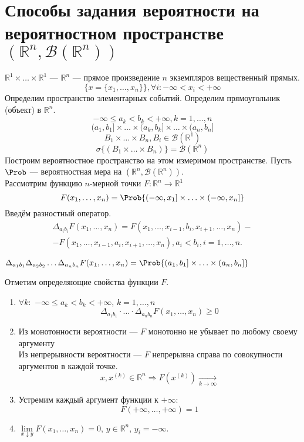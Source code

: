 \section{Способы задания вероятности на вероятностном пространстве $(\mathbb{R}^n, \mathcal{B} (\mathbb{R}^n))$}
$\mathbb{R}^1 \times \ldots \times \mathbb{R}^1$ --- $\mathbb{R}^n$ --- прямое произведение $n$ экземпляров вещественный прямых.
\[
	\{ x = \{ x_1, \ldots, x_n \} \}, \forall i: -\infty < x_i < +\infty
\]
Определим пространство элементарных событий. Определим прямоугольник (объект) в $\mathbb{R}^n$.
\[
	-\infty \leqslant a_k < b_k < +\infty, k = 1, \ldots, n
\]
\[
	(a_1, b_1] \times \ldots \times (a_k, b_k] \times \ldots \times (a_n, b_n]
\]
\[
	B_1 \times \ldots \times B_n, B_i \in \mathcal{B} (\mathbb{R}^1)
\]
\[
	\sigma \{ (B_1 \times \ldots \times B_n) \} = \mathcal{B} (\mathbb{R}^n)
\]
Построим вероятностное пространство на этом измеримом пространстве. Пусть $\Prob$ --- вероятностная мера на $(\mathbb{R}^n, \mathcal{B}(\mathbb{R}^n))$. \\
Рассмотрим функцию $n$-мерной точки $F : \mathbb{R}^n \rightarrow \mathbb{R}^1$
\begin{equation}
	F (x_1, \ldots, x_n) = \Prob \{ (-\infty, x_1] \times \ldots \times (-\infty, x_n] \}
\end{equation}
Введём разностный оператор.
\[
	\begin{split}
		\Delta_{a_i b_i} F(x_1, \ldots, x_n) = F(x_1, \ldots, x_{i-1}, b_i, x_{i+1}, \ldots, x_n) - \\
		- F(x_1, \ldots, x_{i-1}, a_i, x_{i+1}, \ldots, x_n), a_i < b_i, i = 1, \ldots, n.
	\end{split}
\]
\begin{example}
	$\Delta_{a_1 b_1} \Delta_{a_2 b_2} \ldots \Delta_{a_n b_n} F(x_1, \ldots, x_n) = \Prob \{(a_1, b_1] \times \ldots \times (a_n, b_n] \}$
\end{example}
Отметим определяющие свойства функции $F$.
\begin{enumerate}
	\item $\forall k :$ $-\infty \leqslant a_k < b_k < +\infty$, $k = 1, \ldots, n$
	\[
		\Delta_{a_1 b_1} \cdot \ldots \cdot \Delta_{a_n b_n} F(x_1, \ldots, x_n) \geqslant 0
	\]
	\item Из монотонности вероятности --- $F$ монотонно не убывает по любому своему аргументу \\
	Из непрерывности вероятности --- $F$ непрерывна справа по совокупности аргументов в каждой точке.
	\[
		x, x^{(k)} \in \mathbb{R}^n \Rightarrow F(x^{(k)}) \underset{k \to \infty}{\rightarrow}
	\]
	\item Устремим каждый аргумент функции к $+\infty$:
	\[
		F(+\infty, \ldots, +\infty) = 1
	\]
	\item $\lim\limits_{x \downarrow y} F (x_1, \ldots, x_n) = 0$, $y \in \mathbb{R}^n$, $y_i = -\infty$.
\end{enumerate}
